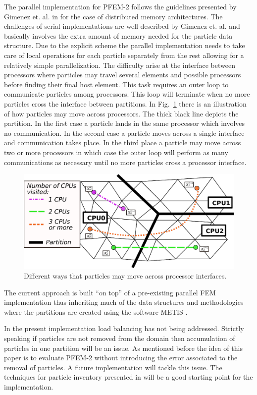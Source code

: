 The parallel implementation for PFEM-2 follows the guidelines presented by Gimenez et. al. in \cite{gimenez:parallel} for the case of distributed memory architectures. The challenges of serial implementations are well described by Gimenez et. al. and basically involves the extra amount of memory needed for the particle data structure. Due to the explicit scheme the parallel implementation needs to take care of local operations for each particle separately from the rest allowing for a relatively simple parallelization. The difficulty arise at the interface between processors where particles may travel several elements and possible processors before finding their final host element. This task requires an outer loop to communicate particles among processors. This loop will terminate when no more particles cross the interface between partitions. In Fig.~\ref{fig:parallel} there is an illustration of how particles may move across processors. The thick black line depicts the partition. In the first case a particle lands in the same processor which involves no communication. In the second case a particle moves across a single interface and communication takes place. In the third place a particle may move across two or more processors in which case the outer loop will perform as many communications as necessary until no more particles cross a processor interface.
%
\begin{figure}[htp] 
\centering 
\includegraphics[scale=.6]{./imgs/parallel.eps}
\caption{Different ways that particles may move across processor interfaces.}
\label{fig:parallel}
\end{figure}
%
The current approach is built ``on top'' of a pre-existing parallel FEM implementation thus inheriting much of the data structures and methodologies where the partitions are created using the software METIS \cite{metis1,metis}.

In the present implementation load balancing has not being addressed. Strictly speaking if particles are not removed from the domain then accumulation of particles in one partition will be an issue. As mentioned before the idea of this paper is to evaluate PFEM-2 without introducing the error associated to the removal of particles. A future implementation will tackle this issue. The techniques for particle inventory presented in \cite{gimenez-difusion} will be a good starting point for the implementation.

